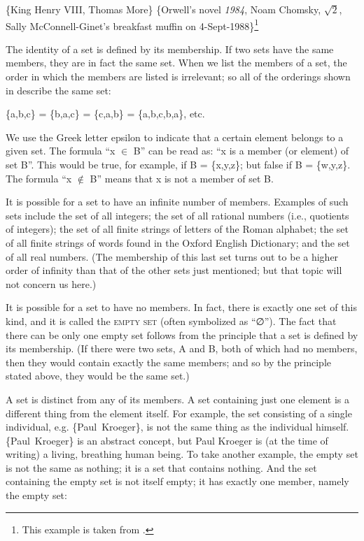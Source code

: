 \ea \label{ex:13.2}
\ea \{King Henry VIII, Thomas More\}
\ex  \{Orwell’s novel \textit{1984}, Noam Chomsky, $\sqrt{2}$, Sally McConnell-Ginet’s breakfast muffin on 4-Sept-1988\}\footnote{This example is taken from \citet[431]{ChierchiaMcConnell-Ginet1990}.}
\z
\z


The identity of a set is defined by its membership. If two sets have the same members, they are in fact the same set. When we list the members of a set, the order in which the members are listed is irrelevant; so all of the orderings shown in  describe the same set:


\ea \label{ex:13.3}
\{a,b,c\} = \{b,a,c\} = \{c,a,b\} = \{a,b,c,b,a\}, etc. 
\z


We use the {Greek} letter epsilon to indicate that a certain element belongs to a given set. The formula “x ${\in}$ B” can be read as: “x is a member (or element) of set B”. This would be true, for example, if B = \{x,y,z\}; but false if B = \{w,y,z\}. The formula “x ${\notin}$ B” means that x is not a member of set B.



It is possible for a set to have an infinite number of members. Examples of such sets include the set of all integers; the set of all rational numbers (i.e., quotients of integers); the set of all finite strings of letters of the Roman alphabet; the set of all finite strings of words found in the Oxford English Dictionary; and the set of all real numbers. (The membership of this last set turns out to be a higher order of infinity than that of the other sets just mentioned; but that topic will not concern us here.)



It is possible for a set to have no members. In fact, there is exactly one set of this kind, and it is called the \textsc{empty set} (often symbolized as “∅”). The fact that there can be only one empty set follows from the principle that a set is defined by its membership. (If there were two sets, A and B, both of which had no members, then they would contain exactly the same members; and so by the principle stated above, they would be the same set.)



A set is distinct from any of its members. A set containing just one element is a different thing from the element itself. For example, the set consisting of a single individual, e.g. \{Paul~Kroeger\}, is not the same thing as the individual himself. \{Paul~Kroeger\} is an abstract concept, but Paul Kroeger is (at the time of writing) a living, breathing human being. To take another example, the empty set is not the same as nothing; it is a set that contains nothing. And the set containing the empty set is not itself empty; it has exactly one member, namely the empty set:


